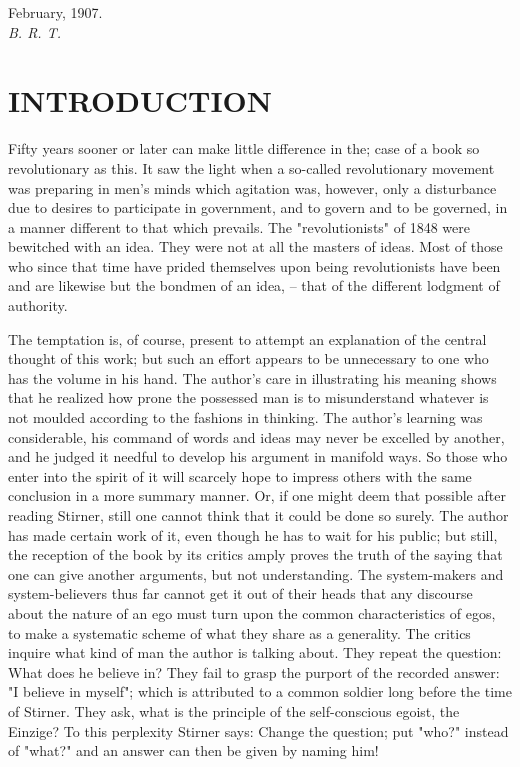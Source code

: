 \documentclass[a4paper]{book}
\begin{document}
\begin{flushright}
February, 1907.\\
 \textit{B. R. T.}\end{flushright}

\chapter[Introduction]{\centering INTRODUCTION}

Fifty years sooner or later can make little difference in the; case of a book 
so revolutionary as this. It saw the light when a so-called revolutionary 
movement was preparing in men's minds which agitation was, however, only a 
disturbance due to desires to participate in government, and to govern and to 
be governed, in a manner different to that which prevails. The 
"{}revolutionists"{} of 1848 were bewitched with an idea. They were not at all 
the masters of ideas. Most of those who since that time have prided themselves 
upon being revolutionists have been and are likewise but the bondmen of an 
idea, -- that of the different lodgment of authority.

The temptation is, of course, present to attempt an explanation of the central 
thought of this work; but such an effort appears to be unnecessary to one who 
has the volume in his hand. The author's care in illustrating his meaning 
shows that he realized how prone the possessed man is to misunderstand 
whatever is not moulded according to the fashions in thinking. The author's 
learning was considerable, his command of words and ideas may never be 
excelled by another, and he judged it needful to develop his argument in 
manifold ways. So those who enter into the spirit of it will scarcely hope to 
impress others with the same conclusion in a more summary manner. Or, if one 
might deem that possible after reading Stirner, still one cannot think that it 
could be done so surely. The author has made certain work of it, even though 
he has to wait for his public; but still, the reception of the book by its 
critics amply proves the truth of the saying that one can give another 
arguments, but not understanding. The system-makers and system-believers thus 
far cannot get it out of their heads that any discourse about the nature of an 
ego must turn upon the common characteristics of egos, to make a systematic 
scheme of what they share as a generality. The critics inquire what kind of 
man the author is talking about. They repeat the question: What does he 
believe in? They fail to grasp the purport of the recorded answer: "{}I 
believe in myself"{}; which is attributed to a common soldier long before the 
time of Stirner. They ask, what is the principle of the self-conscious egoist, 
the Einzige? To this perplexity Stirner says: Change the question; put 
"{}who?"{} instead of "{}what?"{} and an answer can then be given by naming 
him!
\end{document}
